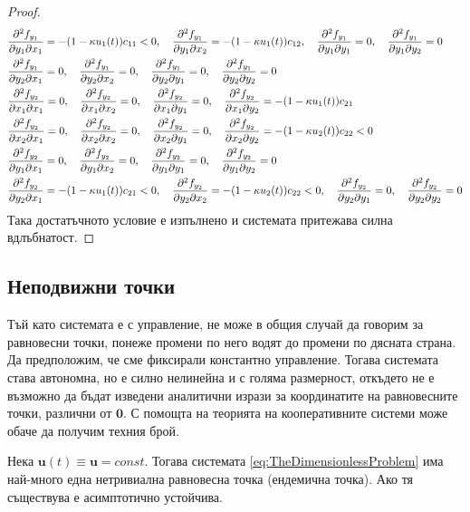 \begin{proof}
{\begin{align*}
    &\pdv{f_{y_1}}{y_1}{x_1} = -(1-\kappa u_1(t))c_{11} < 0, \quad
    \pdv{f_{y_1}}{y_1}{x_2} = -(1-\kappa u_1(t))c_{12}, \quad
    \pdv{f_{y_1}}{y_1}{y_1} = 0, \quad
    \pdv{f_{y_1}}{y_1}{y_2} = 0 \\
    &\pdv{f_{y_1}}{y_2}{x_1} = 0, \quad
    \pdv{f_{y_1}}{y_2}{x_2} = 0, \quad
    \pdv{f_{y_1}}{y_2}{y_1} = 0, \quad
    \pdv{f_{y_1}}{y_2}{y_2} = 0 \\
    &\pdv{f_{y_2}}{x_1}{x_1} = 0, \quad
    \pdv{f_{y_2}}{x_1}{x_2} = 0, \quad
    \pdv{f_{y_2}}{x_1}{y_1} = 0, \quad
    \pdv{f_{y_2}}{x_1}{y_2} = -(1-\kappa u_1(t)) c_{21} \\
    &\pdv{f_{y_2}}{x_2}{x_1} = 0, \quad
    \pdv{f_{y_2}}{x_2}{x_2} = 0, \quad
    \pdv{f_{y_2}}{x_2}{y_1} = 0, \quad
    \pdv{f_{y_2}}{x_2}{y_2} = -(1-\kappa u_2(t)) c_{22} < 0 \\
    &\pdv{f_{y_2}}{y_1}{x_1} = 0, \quad
    \pdv{f_{y_2}}{y_1}{x_2} = 0, \quad
    \pdv{f_{y_2}}{y_1}{y_1} = 0, \quad
    \pdv{f_{y_2}}{y_1}{y_2} = 0 \\
    &\pdv{f_{y_2}}{y_2}{x_1} = -(1-\kappa u_1(t)) c_{21} < 0, \quad
    \pdv{f_{y_2}}{y_2}{x_2} = -(1-\kappa u_2(t)) c_{22} < 0, \quad
    \pdv{f_{y_2}}{y_2}{y_1} = 0, \quad
    \pdv{f_{y_2}}{y_2}{y_2} = 0
  \end{align*}
}
Така достатъчното условие е изпълнено и системата притежава силна вдлъбнатост.
\end{proof}


\subsection{Неподвижни точки}


Тъй като системата е с управление, не може в общия случай да говорим за равновесни точки, понеже промени по него водят до промени по дясната страна.
Да предположим, че сме фиксирали константно управление.
Тогава системата става автономна, но е силно нелинейна и с голяма размерност, откъдето не е възможно да бъдат изведени аналитични изрази за координатите на равновесните точки, различни от $\mathbf{0}$.
С помощта на теорията на кооперативните системи може обаче да получим техния брой.

\begin{proposition}
  Нека $\mathbf{u}(t)\equiv \mathbf{u}=const$. Тогава системата \ref{eq:TheDimensionlessProblem} има най-много една нетривиална равновесна точка (ендемична точка).
  Ако тя съществува е асимптотично устойчива.
\end{proposition}

